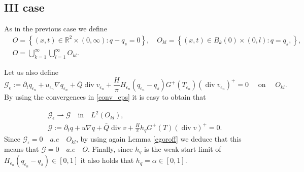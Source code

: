 \documentclass[11pt, a4paper, article,reqno,]{amsart}
\theoremstyle{remark}
\DeclareMathOperator{\dive}{div}
\numberwithin{equation}{section}
\begin{document}
\subsection*{III case}
As in the previous case we define
\begin{equation*}
    \begin{aligned}
        & O = \left\{ (x,t) \in \mathbb{R}^2 \times (0,\infty) : q-q_s = 0\right \}, \quad O_{kl} = \left\{ (x,t) \in B_k(0) \times (0,l) : q=q_s, \right \}, \\
        & O = \bigcup_{k= 1}^{\infty} \bigcup_{l= 1}^{\infty} O_{kl}.
    \end{aligned}
\end{equation*}




Let us also define
\begin{equation*}
    \mathcal{G_\epsilon}:= \partial_t q_{\epsilon_n} + u_{\epsilon_n} \nabla q_{\epsilon_n} + \bar{Q} \dive v_{\epsilon_n} + \frac{H}{\pi} H_{\epsilon_n}(q_{\epsilon_n} -q_s) G^+(T_{\epsilon_n})( \dive v_{\epsilon_n})^+= 0 \quad \text{ on } \quad O_{kl}.
\end{equation*}
By using the convergences in \eqref{conv_eps} it is easy to obtain that 

\begin{equation*}
\begin{aligned}
    &\mathcal{G_\epsilon} \overset{}{\rightharpoonup} \mathcal{G} \quad \text{in} \quad L^2( O_{kl}), \\
    & \mathcal{G}:= \partial_t q + u \nabla q + \bar{Q} \dive v + \frac{H}{\pi} h_q G^+(T)( \dive v)^+=0.
\end{aligned}
\end{equation*}
Since $\mathcal{G_\epsilon} = 0 \quad  a.e \quad  O_{kl}$, by using again Lemma \ref{egoroff} we deduce that  this means that $\mathcal{G} = 0 \quad  a.e \quad  O$. Finally, since $h_q$ is the weak start limit of $H_{\epsilon_n}(q_{\epsilon_{n}}-q_s)\in [0,1]$ it also holds that $h_q = \alpha \in [0,1]$. 
\end{document}

